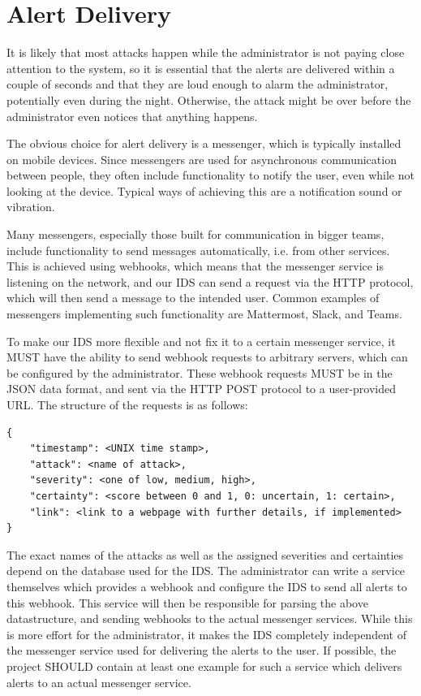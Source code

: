 \documentclass[oneside, english]{reports/assets/sdqtechreport}
\begin{document}
\section{Alert Delivery}
\label{sec:AlertDelivery}
It is likely that most attacks happen while the administrator is not paying
close attention to the system, so it is essential that the alerts are
delivered within a couple of seconds and that they are loud enough to alarm
the administrator, potentially even during the night. Otherwise, the attack
might be over before the administrator even notices that anything happens.

The obvious choice for alert delivery is a messenger, which is typically
installed on mobile devices. Since messengers are used for asynchronous
communication between people, they often include functionality to notify
the user, even while not looking at the device. Typical ways of achieving
this are a notification sound or vibration.

Many messengers, especially those built for communication in bigger teams,
include functionality to send messages automatically, i.e. from other services.
This is achieved using webhooks, which means that the messenger service is
listening on the network, and our IDS can send a request via the HTTP
protocol, which will then send a message to the intended user. Common examples
of messengers implementing such functionality are Mattermost, Slack, and Teams.

To make our IDS more flexible and not fix it to a certain messenger service, it
MUST have the ability to send webhook requests to arbitrary servers, which can
be configured by the administrator. These webhook requests MUST be in the JSON
data format, and sent via the HTTP POST protocol to a user-provided URL. The
structure of the requests is as follows:

\begin{verbatim}
{
	"timestamp": <UNIX time stamp>,
	"attack": <name of attack>,
	"severity": <one of low, medium, high>,
	"certainty": <score between 0 and 1, 0: uncertain, 1: certain>,
	"link": <link to a webpage with further details, if implemented>
}
\end{verbatim}

The exact names of the attacks as well as the assigned severities and
certainties depend on the database used for the IDS. The administrator can
write a service themselves which provides a webhook and configure the IDS to
send all alerts to this webhook. This service will then be responsible for
parsing the above datastructure, and sending webhooks to the actual messenger
services. While this is more effort for the administrator, it makes the IDS
completely independent of the messenger service used for delivering the alerts
to the user. If possible, the project SHOULD contain at least one example for
such a service which delivers alerts to an actual messenger service.
\end{document}
